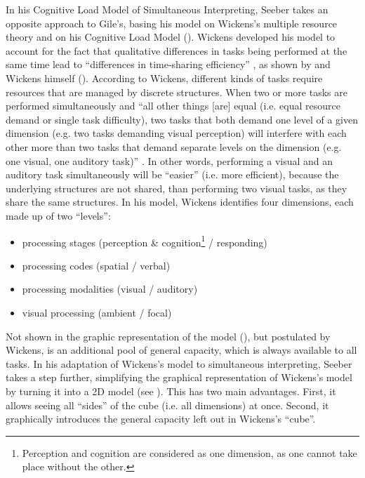 \documentclass[output=paper]{langsci/langscibook}
\begin{document}
In his Cognitive Load Model of Simultaneous Interpreting, Seeber takes an opposite approach to Gile’s, basing his model on Wickens’s multiple resource theory and on his Cognitive Load Model (\citeyear{Wickens1984, Wickens2002}). Wickens developed his model to account for the fact that qualitative differences in tasks being performed at the same time lead to ``differences in time-sharing efficiency'' \citep[162]{Wickens2002}, as shown by \citeauthor{Kantowitz1976} and Wickens himself (\citeyear{Wickens1976}). According to Wickens, different kinds of tasks require resources that are managed by discrete structures. When two or more tasks are performed simultaneously and ``all other things [are] equal (i.e. equal resource demand or single task difficulty), two tasks that both demand one level of a given dimension (e.g. two tasks demanding visual perception) will interfere with each other more than two tasks that demand separate levels on the dimension (e.g. one visual, one auditory task)'' \citep{Wickens2002}. In other words, performing a visual and an auditory task simultaneously will be ``easier'' (i.e. more efficient), because the underlying structures are not shared, than performing two visual tasks, as they share the same structures. In his model, Wickens identifies four dimensions, each made up of two ``levels'':

\begin{itemize}
\item processing stages (perception \& cognition\footnote{Perception and cognition are considered as one dimension, as one cannot take place without the other.} / responding)
\item processing codes (spatial / verbal)
\item processing modalities (visual / auditory)
\item visual processing (ambient / focal)
\end{itemize}

Not shown in the graphic representation of the model (), but postulated by Wickens, is an additional pool of general capacity, which is always available to all tasks. In his adaptation of Wickens’s model to simultaneous interpreting, Seeber takes a step further, simplifying the graphical representation of Wickens’s model by turning it into a 2D model (see ). This has two main advantages. First, it allows seeing all ``sides'' of the cube (i.e. all dimensions) at once. Second, it graphically introduces the general capacity left out in Wickens’s ``cube''. 
\end{document}
